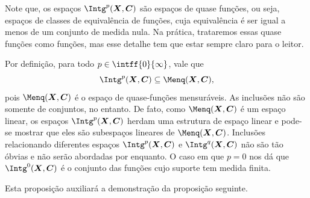 Note que, os espaços $\Intg^p(\bm X,\bm C)$ são espaços de quase funções, ou seja, espaços de classes de equivalência de funções, cuja equivalência é ser igual a menos de um conjunto de medida nula. Na prática, trataremos essas quase funções como funções, mas esse detalhe tem que estar sempre claro para o leitor.

Por definição, para todo $p \in \intff{0}{\infty}$, vale que
	\begin{equation*}
	\Intg^p(\bm X,\bm C) \subseteq \Menq(\bm X,\bm C),
	\end{equation*}
pois $\Menq(\bm X,\bm C)$ é o espaço de quase-funções mensuráveis. As inclusões não são somente de conjuntos, no entanto. De fato, como $\Menq(\bm X,\bm C)$ é um espaço linear, os espaços $\Intg^p(\bm X,\bm C)$ herdam uma estrutura de espaço linear e pode-se mostrar que eles são subespaços lineares de $\Menq(\bm X,\bm C)$. Inclusões relacionando diferentes espaços $\Intg^p(\bm X,\bm C)$ e $\Intg^q(\bm X,\bm C)$ não são tão óbvias e não serão abordadas por enquanto. O caso em que $p=0$ nos dá que $\Intg^0(\bm X,\bm C)$ é o conjunto das funções cujo suporte tem medida finita.

Esta proposição auxiliará a demonstração da proposição seguinte.

